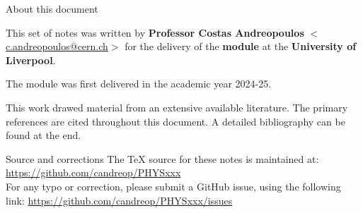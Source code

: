 
\begin{frame}{About this document}

{\scriptsize
  This set of notes was written by
  {\bf Professor Costas Andreopoulos} $<$\href{mailto:c.andreopoulos@cern.ch}{c.andreopoulos@cern.ch}$>$
  for the delivery of the
  {\bf \modulename module}
  at the {\bf University of Liverpool}.\\
  \vspace{0.2cm}

  The module was first delivered in the academic year 2024-25.

  \vspace{0.2cm}

  This work drawed material from an extensive available literature.
  The primary references are cited throughout this document.
  A detailed bibliography can be found at the end.

  \vspace{0.3cm}

  \begin{blocknote}{Source and corrections}
  The TeX source for these notes is maintained at:\\
  {\color{blue} \url{https://github.com/candreop/PHYSxxx}}\\
  \vspace{0.2cm}
  For any typo or correction, please submit a GitHub issue, using
  the following link: {\color{blue} \url{https://github.com/candreop/PHYSxxx/issues}}
  \end{blocknote}
}
\end{frame}
 
